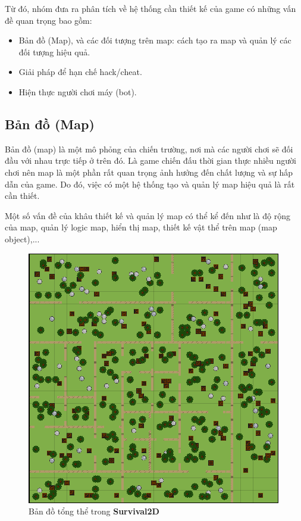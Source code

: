 \documentclass[12pt,a4paper]{article}
\begin{document}
  Từ đó, nhóm đưa ra phân tích về hệ thống cần thiết kế của game có những vấn đề quan trọng bao gồm:
  \begin{itemize}
      \item Bản đồ (Map), và các đối tượng trên map: cách tạo ra map và quản lý các đối tượng hiệu quả.
      \item Giải pháp để hạn chế hack/cheat.
      \item Hiện thực người chơi máy (bot).
  \end{itemize}
  \subsection{Bản đồ (Map)}
  Bản đồ (map) là một mô phỏng của chiến trường, nơi mà các người chơi sẽ đối đầu với nhau trực tiếp ở trên đó. Là game chiến đấu thời gian thực nhiều người chơi nên map là một phần rất quan trọng ảnh hưởng đến chất lượng và sự hấp dẫn của game. Do đó, việc có một hệ thống tạo và quản lý map hiệu quả là rất cần thiết.
  
  Một số vấn đề của khâu thiết kế và quản lý map có thể kể đến như là độ rộng của map, quản lý logic map, hiển thị map, thiết kế vật thể trên map (map object),...
  \begin{figure}[H]
      \centering
      \includegraphics{Img/tilemaps/Main_Small_Map.png}
      \caption{Bản đồ tổng thể trong \textbf{Survival2D} \cite{bib16}}
  \end{figure}
\end{document}

